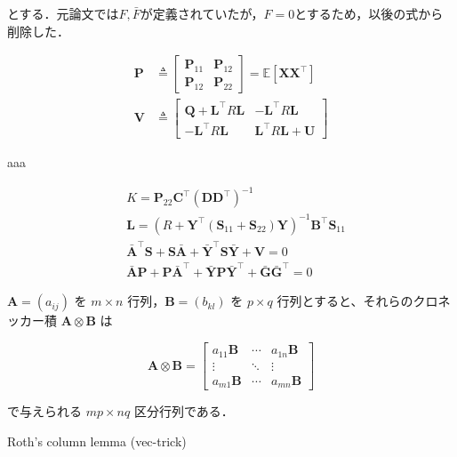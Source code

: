 とする．元論文では$F, \bar{F}$が定義されていたが，$F=0$とするため，以後の式から削除した．


\begin{align}
\mathbf{P} &\triangleq\begin{bmatrix}
\mathbf{P}_{11} & \mathbf{P}_{12} \\
\mathbf{P}_{12} & \mathbf{P}_{22}
\end{bmatrix} = \mathbb{E}\left[\mathbf{X} \mathbf{X}^\top\right] \\
\mathbf{V} &\triangleq\begin{bmatrix}
\mathbf{Q}+\mathbf{L}^\top R \mathbf{L} & -\mathbf{L}^\top R \mathbf{L} \\
-\mathbf{L}^\top R \mathbf{L} & \mathbf{L}^\top R \mathbf{L}+\mathbf{U}
\end{bmatrix}
\end{align}


aaa

\begin{align}
&K=\mathbf{P}_{22} \mathbf{C}^\top\left(\mathbf{D} \mathbf{D}^\top\right)^{-1} \\
&\mathbf{L}=\left(R+\mathbf{Y}^\top\left(\mathbf{S}_{11}+\mathbf{S}_{22}\right) \mathbf{Y}\right)^{-1} \mathbf{B}^\top \mathbf{S}_{11} \\
&\bar{\mathbf{A}}^\top \mathbf{S}+\mathbf{S} \bar{\mathbf{A}}+\bar{\mathbf{Y}}^\top \mathbf{S} \bar{\mathbf{Y}}+\mathbf{V}=0 \\
&\bar{\mathbf{A}} \mathbf{P}+\mathbf{P} \bar{\mathbf{A}}^\top+\bar{\mathbf{Y}} \mathbf{P} \bar{\mathbf{Y}}^\top+\bar{\mathbf{G}} \bar{\mathbf{G}}^\top=0
\end{align}



$\mathbf{A} = (a_{ij})$ を $m \times n$ 行列，$\mathbf{B} = (b_{kl})$ を $p \times q$ 行列とすると、それらのクロネッカー積 $\mathbf{A} \otimes \mathbf{B}$ は


\begin{equation}
\mathbf{A}\otimes \mathbf{B}={\begin{bmatrix}a_{11}\mathbf{B}&\cdots &a_{1n}\mathbf{B}\\\vdots &\ddots &\vdots \\a_{m1}\mathbf{B}&\cdots &a_{mn}\mathbf{B}\end{bmatrix}}
\end{equation}


で与えられる $mp \times nq$ 区分行列である．

Roth's column lemma (vec-trick) 


